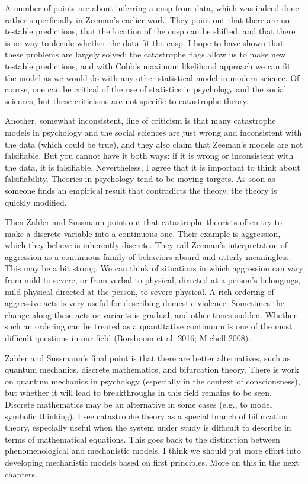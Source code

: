 \documentclass[
  a4paper,
  DIV=11,
  numbers=noendperiod,
  oneside]{scrreprt}
\begin{document}
A number of points are about inferring a cusp from data, which was
indeed done rather superficially in Zeeman's earlier work. They point
out that there are no testable predictions, that the location of the
cusp can be shifted, and that there is no way to decide whether the data
fit the cusp. I hope to have shown that these problems are largely
solved: the catastrophe flags allow us to make new testable predictions,
and with Cobb's maximum likelihood approach we can fit the model as we
would do with any other statistical model in modern science. Of course,
one can be critical of the use of statistics in psychology and the
social sciences, but these criticisms are not specific to catastrophe
theory.

Another, somewhat inconsistent, line of criticism is that many
catastrophe models in psychology and the social sciences are just wrong
and inconsistent with the data (which could be true), and they also
claim that Zeeman's models are not falsifiable. But you cannot have it
both ways: if it is wrong or inconsistent with the data, it is
falsifiable. Nevertheless, I agree that it is important to think about
falsifiability. Theories in psychology tend to be moving targets. As
soon as someone finds an empirical result that contradicts the theory,
the theory is quickly modified.

Then Zahler and Sussmann point out that catastrophe theorists often try
to make a discrete variable into a continuous one. Their example is
aggression, which they believe is inherently discrete. They call
Zeeman's interpretation of aggression as a continuous family of
behaviors absurd and utterly meaningless. This may be a bit strong. We
can think of situations in which aggression can vary from mild to
severe, or from verbal to physical, directed at a person's belongings,
mild physical directed at the person, to severe physical. A rich
ordering of aggressive acts is very useful for describing domestic
violence. Sometimes the change along these acts or variants is gradual,
and other times sudden. Whether such an ordering can be treated as a
quantitative continuum is one of the most difficult questions in our
field (Borsboom et al. 2016; Michell 2008).

Zahler and Sussmann's final point is that there are better alternatives,
such as quantum mechanics, discrete mathematics, and bifurcation theory.
There is work on quantum mechanics in psychology (especially in the
context of consciousness), but whether it will lead to breakthroughs in
this field remains to be seen. Discrete mathematics may be an
alternative in some cases (e.g., to model symbolic thinking). I see
catastrophe theory as a special branch of bifurcation theory, especially
useful when the system under study is difficult to describe in terms of
mathematical equations. This goes back to the distinction between
phenomenological and mechanistic models. I think we should put more
effort into developing mechanistic models based on first principles.
More on this in the next chapters.
\end{document}
